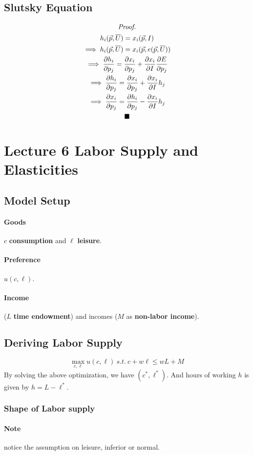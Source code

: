 \documentclass{article}
\begin{document}
		\subsection{Slutsky Equation}
			\begin{multline*}
				\emph{Proof.} \\
				h_i(\vec{p}, \overline{U}) = x_i(\vec{p}, I) \\
				\implies h_i(\vec{p}, \overline{U}) = x_i(\vec{p}, e(\vec{p}, \overline{U})) \\
				\implies \frac{\partial{h_i}}{\partial{p_j}} = \frac{\partial{x_i}}{\partial{p_j}} + \frac{\partial{x_i}}{\partial{I}}\frac{\partial{E}}{\partial{p_j}} \\
				\implies \frac{\partial{h_i}}{\partial{p_j}} = \frac{\partial{x_i}}{\partial{p_j}} + \frac{\partial{x_i}}{\partial{I}}h_j \\
				\implies \frac{\partial{x_i}}{\partial{p_j}} = \frac{\partial{h_i}}{\partial{p_j}} - \frac{\partial{x_i}}{\partial{I}}h_j \\
				\blacksquare
			\end{multline*}
			
	\section{Lecture 6 Labor Supply and Elasticities}
		\subsection{Model Setup}
			\paragraph{Goods} $c$ \textbf{consumption} and $\ell$ \textbf{leisure}.
			\paragraph{Preference} $u(c, \ell)$.
			\paragraph{Income}  ($L$ \textbf{time endowment}) and  incomes ($M$ as \textbf{non-labor income}).
		
		\subsection{Deriving Labor Supply}
			\[
				\max_{c,\ell} u(c, \ell)\ s.t.\ c + w\ell \leq wL + M
			\]
			By solving the above optimization, we have $(c ^*, \ell ^*)$. And hours of working $h$ is given by $h = L - \ell ^*$.
			
			\subsubsection{Shape of Labor supply}
				\paragraph{Note} notice the assumption on leisure, inferior or normal.
		
\end{document}
